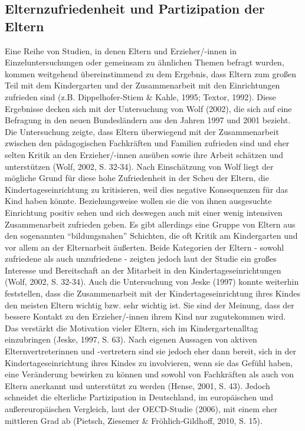 \documentclass[12pt,a4paper]{article}
\begin{document}
\subsection{Elternzufriedenheit und Partizipation der Eltern} 
Eine Reihe von Studien, in denen Eltern und Erzieher/-innen in Einzeluntersuchungen oder gemeinsam zu ähnlichen Themen befragt wurden, kommen weitgehend übereinstimmend zu dem Ergebnis, dass Eltern zum großen Teil mit dem Kindergarten und der Zusammenarbeit mit den Einrichtungen zufrieden sind (z.B. Dippelhofer-Stiem \& Kahle, 1995; Textor, 1992). Diese Ergebnisse decken sich mit der Untersuchung von Wolf (2002), die sich auf eine Befragung in den neuen Bundesländern aus den Jahren 1997 und 2001 bezieht. Die Untersuchung zeigte, dass Eltern überwiegend mit der Zusammenarbeit zwischen den pädagogischen Fachkräften und Familien zufrieden sind und eher selten Kritik an den Erzieher/-innen ausüben sowie ihre Arbeit schätzen und unterstützen (Wolf, 2002, S. 32-34).
	Nach Einschätzung von Wolf liegt der mögliche Grund für diese hohe Zufriedenheit in der Scheu der Eltern, die Kindertageseinrichtung zu kritisieren, weil dies negative Konsequenzen für das Kind haben könnte. Beziehungsweise wollen sie die von ihnen ausgesuchte Einrichtung positiv sehen und sich deswegen auch mit einer wenig intensiven Zusammenarbeit zufrieden geben. Es gibt allerdings eine Gruppe von Eltern aus den sogenannten "`bildungsnahen"' Schichten, die oft Kritik am Kindergarten und vor allem an der Elternarbeit äußerten. Beide Kategorien der Eltern - sowohl zufriedene als auch unzufriedene - zeigten jedoch laut der Studie ein großes Interesse und Bereitschaft an der Mitarbeit in den Kindertageseinrichtungen (Wolf, 2002, S. 32-34).
Auch die Untersuchung von Jeske (1997) konnte weiterhin feststellen, dass die Zusammenarbeit mit der Kindertageseinrichtung ihres Kindes den meisten Eltern wichtig bzw. sehr wichtig ist. Sie sind der Meinung, dass der bessere Kontakt zu den Erzieher/-innen ihrem Kind nur zugutekommen wird. Das verstärkt die Motivation vieler Eltern, sich im Kindergartenalltag einzubringen  (Jeske, 1997, S. 63). 
Nach eigenen Aussagen von aktiven Elternvertreterinnen und -vertretern sind sie jedoch eher dann bereit, sich in der Kindertageseinrichtung ihres Kindes zu involvieren, wenn sie das Gefühl haben, eine Veränderung bewirken zu können und sowohl von Fachkräften als auch von Eltern anerkannt und unterstützt zu werden (Hense, 2001, S. 43). Jedoch schneidet die elterliche Partizipation in Deutschland, im europäischen und außereuropäischen Vergleich, laut der OECD-Studie (2006), mit einem eher mittleren Grad ab (Pietsch, Ziesemer \& Fröhlich-Gildhoff, 2010, S. 15).
\end{document}
